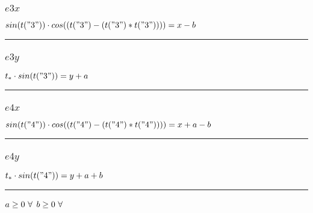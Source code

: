 \documentclass[11pt]{article}
\begin{document}
\subsubsection*{$e3x$}
$
 sin(t("3"))  \cdot  cos((t("3") - (t("3") * t("3"))))  = x - b
$
\vspace{5pt}
\hrule
\subsubsection*{$e3y$}
$
t_{*} \cdot  sin(t("3"))  = y + a
$
\vspace{5pt}
\hrule
\subsubsection*{$e4x$}
$
 sin(t("4"))  \cdot  cos((t("4") - (t("4") * t("4"))))  = x + a - b
$
\vspace{5pt}
\hrule
\subsubsection*{$e4y$}
$
t_{*} \cdot  sin(t("4"))  = y + a + b
$
\vspace{5pt}
\hrule
\bigskip
$a\geq 0 ~ \forall \\$
$b\geq 0 ~ \forall \\$
\end{document}

